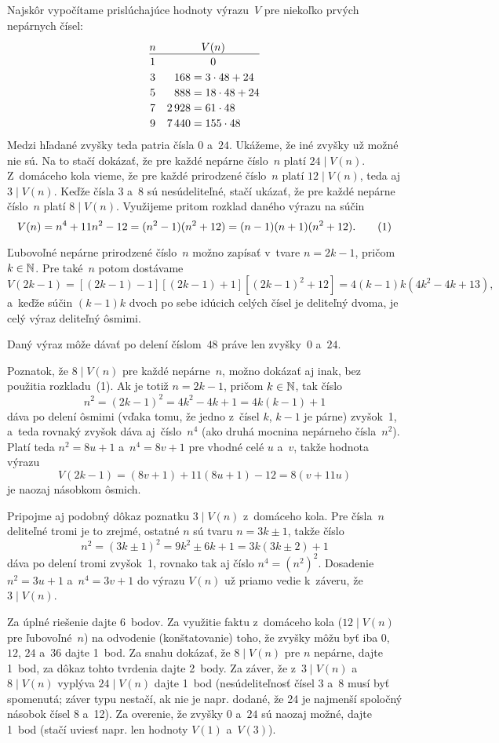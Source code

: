 {%
Najskôr vypočítame prislúchajúce hodnoty výrazu~$V$ pre niekoľko prvých
nepárnych čísel:
$$
\vbox{\halign{\hss\strut$#$\hss&\quad \hss$#$&${}=#$\hss\cr
n &\multispan2\quad\hss $V(n)$\hss\cr
\noalign{\hrule}
1 &\multispan2\quad\hss 0\hss\cr
3 & 168 & 3\cdot48+24\cr
5 & 888 & 18\cdot48+24\cr
7 & 2\,928 & 61\cdot48\cr
9 & 7\,440 & 155\cdot48\cr
}}
$$
Medzi hľadané zvyšky teda patria čísla $0$ a~$24$. Ukážeme, že iné
zvyšky už možné nie sú. Na to stačí dokázať, že pre každé nepárne
číslo~$n$ platí $24\mid V(n)$.
Z~domáceho kola vieme, že pre každé prirodzené číslo~$n$
platí $12\mid V(n)$, teda aj $3\mid V(n)$.
Keďže čísla $3$ a~$8$ sú nesúdeliteľné, stačí ukázať,
že pre každé nepárne číslo~$n$ platí $8\mid V(n)$.
Využijeme pritom rozklad daného výrazu na súčin
$$
V(n)=n^{4}+11n^{2}-12=(n^{2}-1)(n^{2}+12)=(n-1)(n+1)(n^{2}+12). \tag1
$$

Ľubovoľné nepárne prirodzené číslo~$n$ možno zapísať v~tvare $n=2k-1$,
pričom $k\in\Bbb{N}$. Pre také~$n$ potom dostávame
$$
V(2k-1)=[(2k-1)-1][(2k-1)+1][(2k-1)^{2}+12]=4(k-1)k(4k^{2}-4k+13),
$$
a~keďže súčin $(k-1)k$ dvoch po sebe idúcich
celých čísel je deliteľný dvoma, je celý výraz deliteľný ôsmimi.

\zaver
Daný výraz môže dávať po delení číslom~$48$ práve len zvyšky~$0$
a~$24$.

\poznamka
Poznatok, že $8\mid V(n)$ pre každé nepárne~$n$, možno dokázať aj inak,
bez použitia rozkladu~(1). Ak je totiž $n=2k-1$, pričom $k\in\Bbb N$, tak číslo
$$
n^2=(2k-1)^2=4k^2-4k+1=4k(k-1)+1
$$
dáva po delení ôsmimi (vďaka tomu, že jedno z~čísel $k$, $k-1$ je párne) zvyšok~1,
a~teda rovnaký zvyšok dáva aj~číslo~$n^4$ (ako druhá mocnina nepárneho čísla~$n^2$).
Platí teda $n^2=8u+1$ a~$n^4=8v+1$ pre vhodné celé $u$ a~$v$, takže hodnota výrazu
$$
V(2k-1)=(8v+1)+11(8u+1)-12=8(v+11u)
$$
je naozaj násobkom ôsmich.

Pripojme aj podobný dôkaz poznatku $3\mid V(n)$ z~domáceho kola.
Pre čísla~$n$ deliteľné tromi je to zrejmé, ostatné $n$ sú tvaru $n=3k\pm1$, takže číslo
$$
n^2=(3k\pm1)^2=9k^2\pm6k+1=3k(3k\pm2)+1
$$
dáva po delení tromi zvyšok~1, rovnako tak aj číslo $n^4=(n^2)^2$.
Dosadenie $n^2=3u+1$ a~$n^4=3v+1$ do výrazu $V(n)$ už priamo vedie k~záveru, že $3\mid V(n)$.

\nobreak\medskip\petit\noindent
Za úplné riešenie dajte 6~bodov. Za využitie faktu z~domáceho kola ($12\mid
V(n)$ pre ľubovoľné~$n$) na odvodenie (konštatovanie) toho, že zvyšky môžu
byť iba $0$, $12$, $24$ a~$36$ dajte 1~bod.
Za snahu dokázať, že $8\mid V(n)$ pre $n$ nepárne, dajte 1~bod,
za dôkaz tohto tvrdenia dajte 2~body.
Za záver, že
z~$3\mid V(n)$ a~$8\mid V(n)$ vyplýva
$24\mid V(n)$ dajte 1~bod (nesúdeliteľnosť čísel $3$ a~$8$ musí byť
spomenutá; záver typu  nestačí, ak nie je napr. dodané, že 24 je najmenší spoločný
násobok čísel 8 a~12). Za overenie, že zvyšky $0$ a~$24$ sú naozaj možné,
dajte 1~bod (stačí uviesť napr. len hodnoty $V(1)$ a~$V(3)$).

\endpetit
\bigbreak
}

